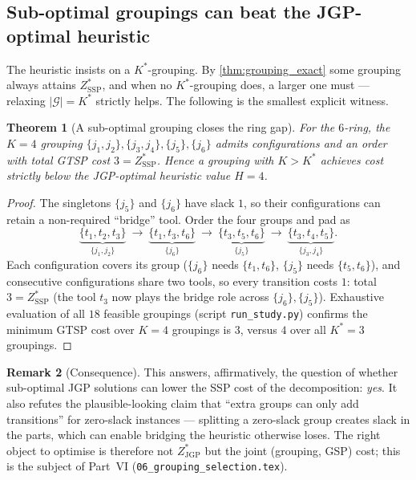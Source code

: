 \documentclass[11pt,a4paper]{article}
\theoremstyle{plain}
\newtheorem{theorem}{Theorem}[section]
\theoremstyle{definition}
\newtheorem{remark}[theorem]{Remark}
\newcommand{\Kstar}{K^{*}}
\newcommand{\ZJGP}{Z_{\mathrm{JGP}}^{*}}
\newcommand{\ZSSP}{Z_{\mathrm{SSP}}^{*}}
\begin{document}
\subsection{Sub-optimal groupings can beat the JGP-optimal heuristic}

The heuristic insists on a $\Kstar$-grouping. By \cref{thm:grouping_exact} some grouping
always attains $\ZSSP$, and when no $\Kstar$-grouping does, a larger one must --- relaxing
$|\mathcal{G}|=\Kstar$ strictly helps. The following is the smallest explicit witness.

\begin{thmbox}
\begin{theorem}[A sub-optimal grouping closes the ring gap]
\label{thm:subopt}
For the $6$-ring, the $K=4$ grouping
$\{j_1,j_2\},\{j_3,j_4\},\{j_5\},\{j_6\}$ admits configurations and an order with total
GTSP cost $3=\ZSSP$. Hence a grouping with $K>\Kstar$ achieves cost strictly below the
JGP-optimal heuristic value $H=4$.
\end{theorem}
\end{thmbox}
\begin{proofbox}
\begin{proof}
The singletons $\{j_5\}$ and $\{j_6\}$ have slack $1$, so their configurations can retain
a non-required ``bridge'' tool. Order the four groups and pad as
\[
  \underbrace{\{t_1,t_2,t_3\}}_{\{j_1,j_2\}}\ \to\
  \underbrace{\{t_1,t_3,t_6\}}_{\{j_6\}}\ \to\
  \underbrace{\{t_3,t_5,t_6\}}_{\{j_5\}}\ \to\
  \underbrace{\{t_3,t_4,t_5\}}_{\{j_3,j_4\}} .
\]
Each configuration covers its group ($\{j_6\}$ needs $\{t_1,t_6\}$, $\{j_5\}$ needs
$\{t_5,t_6\}$), and consecutive configurations share two tools, so every transition costs
$1$: total $3=\ZSSP$ (the tool $t_3$ now plays the bridge role across $\{j_6\},\{j_5\}$).
Exhaustive evaluation of all $18$ feasible groupings (script \texttt{run\_study.py})
confirms the minimum GTSP cost over $K=4$ groupings is $3$, versus $4$ over all
$\Kstar=3$ groupings.
\end{proof}
\end{proofbox}

\begin{remark}[Consequence]
This answers, affirmatively, the question of whether sub-optimal JGP solutions can lower
the SSP cost of the decomposition: \emph{yes}. It also refutes the plausible-looking claim
that ``extra groups can only add transitions'' for zero-slack instances --- splitting a
zero-slack group creates slack in the parts, which can enable bridging the heuristic
otherwise loses. The right object to optimise is therefore not $\ZJGP$ but the joint
(grouping, GSP) cost; this is the subject of Part~VI
(\texttt{06\_grouping\_selection.tex}).
\end{remark}
\end{document}
